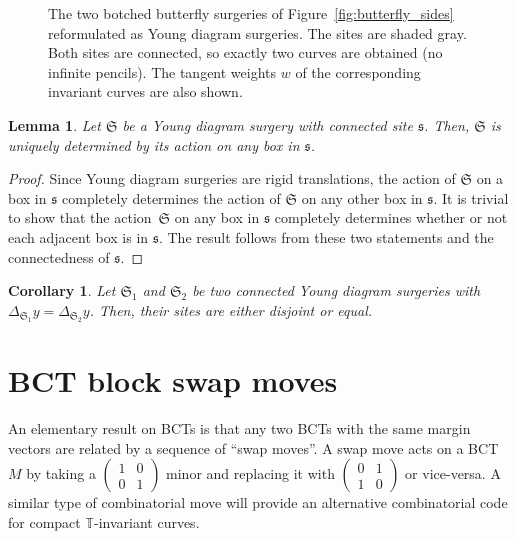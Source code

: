 \documentclass[pdftex]{sigma}
\numberwithin{equation}{section}
\newtheorem{Corollary}[Theorem]{Corollary}
\newtheorem{Lemma}[Theorem]{Lemma}
\newcommand{\torus}{\mathbb T}
\newcommand{\site}{\mathfrak s}
\newcommand{\surgery}{\mathfrak S}
\begin{document}
\begin{figure}
{
}

\caption{The two botched butterfly surgeries of Figure~\ref{fig:butterfly_sides} reformulated as Young diagram surgeries. The sites are shaded gray. Both sites are connected, so exactly two curves are obtained (no infinite pencils). The tangent weights $w$ of the corresponding invariant curves are also shown.}
\label{fig:yd_surgeries}
\end{figure}

\begin{Lemma} \label{lemma:surgery_uniqueness}
Let $\surgery$ be a Young diagram surgery with connected site $\site$. Then, $\surgery$ is uniquely determined by its action on any box in $\site$.
\end{Lemma}
\begin{proof}
Since Young diagram surgeries are rigid translations, the action of $\surgery$ on a box in $\site$ completely determines the action of $\surgery$ on any other box in $\site$. It is trivial to show that the action~$\surgery$ on any box in $\site$ completely determines whether or not each adjacent box is in $\site$. The result follows from these two statements and the connectedness of $\site$.
\end{proof}


\begin{Corollary} \label{cor:disjoint_sites}
Let $\surgery_1$ and $\surgery_2$ be two connected Young diagram surgeries with $\Delta_{\surgery_1}y=\Delta_{\surgery_2}y$. Then, their sites are either disjoint or equal.
\end{Corollary}

\section{BCT block swap moves} \label{sec:block_swap}
An elementary result on BCTs is that any two BCTs with the same margin vectors are related by a sequence of ``swap moves''. A swap move acts on a BCT $M$ by taking a $\left(\begin{smallmatrix} 1 & 0 \\ 0 & 1 \end{smallmatrix}\right)$ minor and replacing it with $\left(\begin{smallmatrix} 0 & 1 \\ 1 & 0 \end{smallmatrix}\right)$ or vice-versa. A similar type of combinatorial move will provide an alternative combinatorial code for compact $\torus$-invariant curves.
\end{document}

